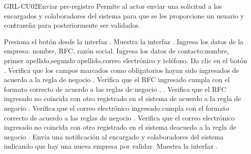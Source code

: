 \begin{UseCase}[]{GRL-CU02}{Enviar pre-registro}{
	Permite al actor enviar una solicitud a los encargados y colaboradores del sistema para que se les proporcione un usuario y contraseña
	para posteriormente ser validados.
}
\end{UseCase}

\begin{UCtrayectoria}
	\UCpaso [\UCactor] Presiona el botón  desde la interfaz .
    \UCpaso [\UCsist] Muestra la interfaz .
	\UCpaso [\UCactor] Ingresa los datos de la empresa: nombre, RFC, 
	razón social.\label{cu02-grl1}
	\UCpaso [\UCactor] Ingresa los datos de contacto:nombre, primer apellido,segundo apellido,correo electrónico y teléfono.
	\UCpaso [\UCactor] Da clic en el botón . 
    \UCpaso [\UCsist] Verifica que los campos marcados como obligatorios hayan sido ingresados de acuerdo a la regla de negocio .
	\UCpaso [\UCsist] Verifica que el RFC ingresado cumpla con el formato correcto de acuerdo a las reglas de negocio  , .
	\UCpaso [\UCsist] Verifica que el RFC ingresado no coincida con otro registrado en el sistema de acuerdo a la regla de negocio .
	\UCpaso [\UCsist] Verifica que el correo electrónico ingresado cumpla con el formato correcto de acuerdo a las reglas de negocio  . \label{cu02-grl2}
	\UCpaso [\UCsist] Verifica que el correo electrónico ingresado no coincida con otro registrado en el sistema deacuedo a la regla de negocio  .
	\UCpaso [\UCsist] Envia una notificación al encargado y colaboradores del sistema indicando que hay una nueva empresa por validar.
    \UCpaso [\UCsist] Muestra la interfaz .
\end{UCtrayectoria}

